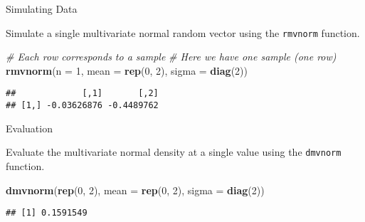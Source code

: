 \documentclass[ignorenonframetext,]{beamer}
\newenvironment{Shaded}{\begin{snugshade}}{\end{snugshade}}
\newcommand{\KeywordTok}[1]{\textcolor[rgb]{0.13,0.29,0.53}{\textbf{#1}}}
\newcommand{\DataTypeTok}[1]{\textcolor[rgb]{0.13,0.29,0.53}{#1}}
\newcommand{\DecValTok}[1]{\textcolor[rgb]{0.00,0.00,0.81}{#1}}
\newcommand{\CommentTok}[1]{\textcolor[rgb]{0.56,0.35,0.01}{\textit{#1}}}
\newcommand{\NormalTok}[1]{#1}
\begin{document}
\begin{frame}[fragile]{Simulating Data}

Simulate a single multivariate normal random vector using the
\texttt{rmvnorm} function.

\begin{Shaded}
\begin{Highlighting}[]
\CommentTok{# Each row corresponds to a sample}
\CommentTok{# Here we have one sample (one row)}
\KeywordTok{rmvnorm}\NormalTok{(}\DataTypeTok{n =} \DecValTok{1}\NormalTok{, }\DataTypeTok{mean =} \KeywordTok{rep}\NormalTok{(}\DecValTok{0}\NormalTok{, }\DecValTok{2}\NormalTok{), }\DataTypeTok{sigma =} \KeywordTok{diag}\NormalTok{(}\DecValTok{2}\NormalTok{))}
\end{Highlighting}
\end{Shaded}

\begin{verbatim}
##             [,1]       [,2]
## [1,] -0.03626876 -0.4489762
\end{verbatim}

\end{frame}

\begin{frame}[fragile]{Evaluation}

Evaluate the multivariate normal density at a single value using the
\texttt{dmvnorm} function.

\begin{Shaded}
\begin{Highlighting}[]
\KeywordTok{dmvnorm}\NormalTok{(}\KeywordTok{rep}\NormalTok{(}\DecValTok{0}\NormalTok{, }\DecValTok{2}\NormalTok{), }\DataTypeTok{mean =} \KeywordTok{rep}\NormalTok{(}\DecValTok{0}\NormalTok{, }\DecValTok{2}\NormalTok{), }\DataTypeTok{sigma =} \KeywordTok{diag}\NormalTok{(}\DecValTok{2}\NormalTok{))}
\end{Highlighting}
\end{Shaded}

\begin{verbatim}
## [1] 0.1591549
\end{verbatim}

\end{frame}
\end{document}
